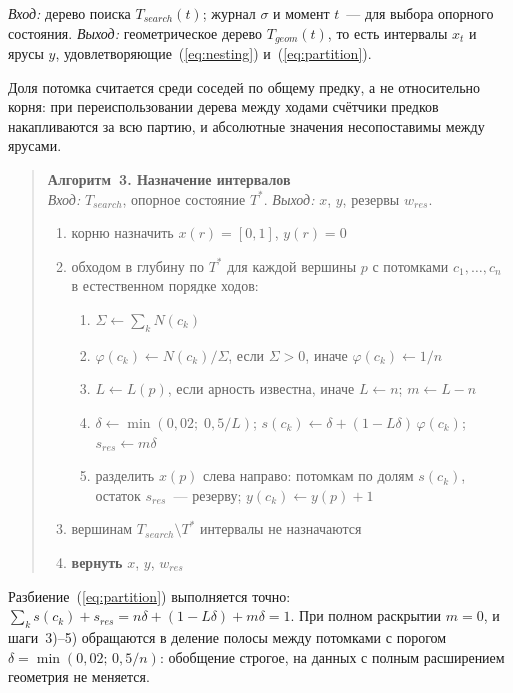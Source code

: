 \emph{Вход:} дерево поиска $T_{search}(t)$; журнал $\sigma$ и момент $t$~---
для выбора опорного состояния.
\emph{Выход:} геометрическое дерево $T_{geom}(t)$, то есть интервалы $x_t$
и ярусы $y$, удовлетворяющие~(\ref{eq:nesting}) и~(\ref{eq:partition}).

Доля потомка считается среди соседей по общему предку, а не относительно
корня: при переиспользовании дерева между ходами счётчики предков
накапливаются за всю партию, и абсолютные значения несопоставимы между
ярусами.

\begin{quote}
\textbf{Алгоритм~3. Назначение интервалов}\\
\emph{Вход:} $T_{search}$, опорное состояние $T^{*}$. \emph{Выход:} $x$,
$y$, резервы $w_{res}$.
\begin{enumerate}
  \item корню назначить $x(r) = [0, 1]$, $y(r) = 0$
  \item обходом в глубину по $T^{*}$ для каждой вершины $p$ с потомками
        $c_1, \dots, c_n$ в естественном порядке ходов:
  \begin{enumerate}
    \item $\Sigma \leftarrow \sum_{k} N(c_k)$
    \item $\varphi(c_k) \leftarrow N(c_k) / \Sigma$, если $\Sigma > 0$,
          иначе $\varphi(c_k) \leftarrow 1/n$
    \item $L \leftarrow L(p)$, если арность известна, иначе $L \leftarrow n$;
          \quad $m \leftarrow L - n$
    \item $\delta \leftarrow \min(0{,}02;\; 0{,}5/L)$;\quad
          $s(c_k) \leftarrow \delta + (1 - L\delta)\,\varphi(c_k)$;\quad
          $s_{res} \leftarrow m\delta$
    \item разделить $x(p)$ слева направо: потомкам по долям $s(c_k)$,
          остаток $s_{res}$~--- резерву; $y(c_k) \leftarrow y(p) + 1$
  \end{enumerate}
  \item вершинам $T_{search} \setminus T^{*}$ интервалы не назначаются
  \item \textbf{вернуть} $x$, $y$, $w_{res}$
\end{enumerate}
\end{quote}

Разбиение~(\ref{eq:partition}) выполняется точно:
$\sum_k s(c_k) + s_{res} = n\delta + (1 - L\delta) + m\delta = 1$.
При полном раскрытии $m = 0$, и шаги~3)--5) обращаются в деление полосы
между потомками с порогом $\delta = \min(0{,}02;\, 0{,}5/n)$: обобщение
строгое, на данных с полным расширением геометрия не меняется.


